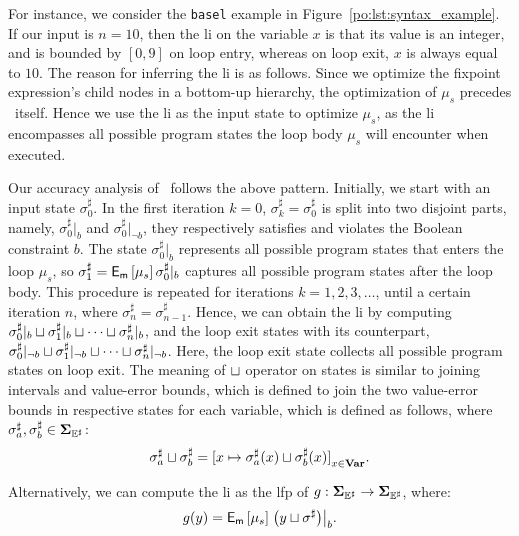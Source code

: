 For instance, we consider the \verb|basel| example in
Figure~\ref{po:lst:syntax_example}.  If our input is $n = 10$, then the
\gls{li} on the variable $x$ is that its value is an integer, and is bounded
by $[0, 9]$ on loop entry, whereas on loop exit, $x$ is always equal to $10$.
The reason for inferring the \gls{li} is as follows.  Since we optimize the
fixpoint expression's child nodes in a bottom-up hierarchy, the optimization of
$\mu_s$ precedes \fixexprmir~itself.  Hence we use the \gls{li} as the input
state to optimize $\mu_s$, as the \gls{li} encompasses all possible program
states the loop body $\mu_s$ will encounter when executed.

Our accuracy analysis of \fixexprmir~follows the above pattern.  Initially,
we start with an input state $\sigma^\sharp_0$.  In the first iteration
$k = 0$, $\sigma^\sharp_k = \sigma^\sharp_0$ is split into two disjoint
parts, namely, $\sigma^\sharp_0|_b$ and $\sigma^\sharp_0|_{\neg b}$, they
respectively satisfies and violates the Boolean constraint $b$.  The state
$\sigma^\sharp_0|_b$ represents all possible program states that enters the
loop $\mu_s$, so $\sigma^\sharp_1 = \operatorname{\mathsf{E}_\mathsf{m}}\left[{\mu_s}\right]{\sigma^\sharp_0|_b}$
captures all possible program states after the loop body.  This procedure
is repeated for iterations $k = 1, 2, 3, \ldots$, until a certain iteration
$n$, where $\sigma^\sharp_n = \sigma^\sharp_{n-1}$.  Hence, we can obtain the
\gls{li} by computing $\sigma^\sharp_0|_b \sqcup \sigma^\sharp_1|_b \sqcup \cdots
\sqcup \sigma^\sharp_n|_b$, and the loop exit states with its counterpart,
\ie~$\sigma^\sharp_0|_{\neg b} \sqcup \sigma^\sharp_1|_{\neg b} \sqcup \cdots
\sqcup \sigma^\sharp_n|_{\neg b}$.  Here, the loop exit state collects all
possible program states on loop exit.  The meaning of $\sqcup$ operator on
states is similar to joining intervals and value-error bounds, which is defined
to join the two value-error bounds in respective states for each variable,
which is defined as follows, where $\sigma^\sharp_a, \sigma^\sharp_b \in
\mathbf{\Sigma}_{\mathbb{E}^\sharp}$:
\begin{equation}
    \sigma^\sharp_a \join \sigma^\sharp_b =
        {%
            [ x \mapsto \sigma^\sharp_a(x) \join \sigma^\sharp_b(x) ]
        }_{x \in \varset}.
\end{equation}

Alternatively, we can compute the \gls{li} as the \gls{lfp} of $g: \mathbf{\Sigma}_{\mathbb{E}^\sharp}
\to \mathbf{\Sigma}_{\mathbb{E}^\sharp}$, where:
\begin{equation}
    g(y) = \operatorname{\mathsf{E}_\mathsf{m}}\left[{\mu_s}\right]{
        \left.\left( y \ensuremath\sqcup\sigma^\sharp \right)\right|_b
    }.
\end{equation}

